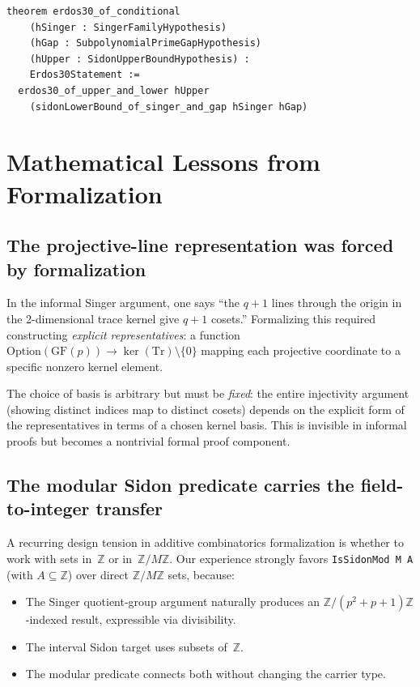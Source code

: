 \documentclass[11pt,a4paper]{article}
\begin{document}
\begin{lstlisting}
theorem erdos30_of_conditional
    (hSinger : SingerFamilyHypothesis)
    (hGap : SubpolynomialPrimeGapHypothesis)
    (hUpper : SidonUpperBoundHypothesis) :
    Erdos30Statement :=
  erdos30_of_upper_and_lower hUpper
    (sidonLowerBound_of_singer_and_gap hSinger hGap)
\end{lstlisting}

\section{Mathematical Lessons from Formalization}
\label{sec:lessons}

\subsection{The projective-line representation was forced by formalization}

In the informal Singer argument, one says ``the $q+1$ lines through the origin
in the 2-dimensional trace kernel give $q+1$ cosets.''  Formalizing this
required constructing \emph{explicit representatives}: a function
$\mathrm{Option}(\mathrm{GF}(p)) \to \ker(\mathrm{Tr}) \setminus \{0\}$
mapping each projective coordinate to a specific nonzero kernel element.

The choice of basis is arbitrary but must be \emph{fixed}: the entire injectivity
argument (showing distinct indices map to distinct cosets) depends on the explicit
form of the representatives in terms of a chosen kernel basis.  This is invisible
in informal proofs but becomes a nontrivial formal proof component.

\subsection{The modular Sidon predicate carries the field-to-integer transfer}

A recurring design tension in additive combinatorics formalization is whether to
work with sets in~$\mathbb{Z}$ or in~$\mathbb{Z}/M\mathbb{Z}$.  Our experience
strongly favors \texttt{IsSidonMod M A} (with $A \subseteq \mathbb{Z}$) over
direct $\mathbb{Z}/M\mathbb{Z}$ sets, because:
\begin{itemize}[nosep]
  \item The Singer quotient-group argument naturally produces an
    $\mathbb{Z}/(p^2+p+1)\mathbb{Z}$-indexed result, expressible via divisibility.
  \item The interval Sidon target uses subsets of~$\mathbb{Z}$.
  \item The modular predicate connects both without changing the carrier type.
\end{itemize}
\end{document}
